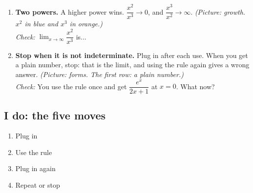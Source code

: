 \documentclass[11pt]{article}
\begin{document}
\begin{enumerate}
\item \textbf{Two powers.} A higher power wins. $\dfrac{x^2}{x^3}\to0$, and $\dfrac{x^3}{x^2}\to\infty$. \textit{(Picture: growth. $x^2$ in blue and $x^3$ in orange.)}\\ \textit{Check:} $\displaystyle\lim_{x\to\infty}\dfrac{x^2}{x^3}$ is... 
\item \textbf{Stop when it is not indeterminate.} Plug in after each use. When you get a plain number, stop: that is the limit, and using the rule again gives a wrong answer. \textit{(Picture: forms. The first row: a plain number.)}\\ \textit{Check:} You use the rule once and get $\dfrac{e^x}{2x+1}$ at $x=0$. What now? 
\end{enumerate}
\subsection*{I do: the five moves}\begin{enumerate}\item Plug in
\item Use the rule
\item Plug in again
\item Repeat or stop\end{enumerate}
\end{document}
